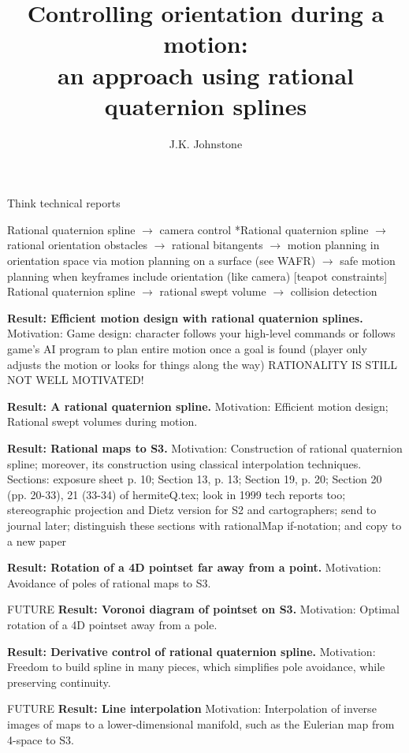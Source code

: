 \documentclass[12pt]{article}
\title{Controlling orientation during a motion:\\ 
       an approach using rational quaternion splines}
\author{J.K. Johnstone}
\begin{document}
\maketitle


Think technical reports

Rational quaternion spline $\rightarrow$ camera control 
*Rational quaternion spline  $\rightarrow$ rational orientation obstacles 
 $\rightarrow$ rational bitangents
 $\rightarrow$ motion planning in orientation space via motion planning on a surface
          (see WAFR)
  $\rightarrow$ safe motion planning when keyframes include orientation (like camera)
    [teapot constraints]
Rational quaternion spline  $\rightarrow$ rational swept volume  $\rightarrow$ 
collision detection

{\bf Result: Efficient motion design with rational quaternion splines.}
Motivation: Game design: character follows your high-level commands or follows
            game's AI program to plan entire motion once a goal is found (player only
	    adjusts the motion or looks for things along the way)
	    RATIONALITY IS STILL NOT WELL MOTIVATED!

{\bf Result: A rational quaternion spline.}
Motivation: Efficient motion design; Rational swept volumes during motion.

{\bf Result: Rational maps to S3.}
Motivation: Construction of rational quaternion spline; 
            moreover, its construction using classical interpolation techniques.
Sections: exposure sheet p. 10; Section 13, p. 13; Section 19, p. 20; 
          Section 20 (pp. 20-33), 21 (33-34) of hermiteQ.tex;
	  look in 1999 tech reports too; stereographic projection 
	  and Dietz version for S2 and cartographers;
	  send to journal later;
  distinguish these sections with rationalMap if-notation;
  and copy to a new paper

{\bf *Result: Rotation of a 4D pointset far away from a point.}
Motivation: Avoidance of poles of rational maps to S3.

FUTURE
{\bf Result: Voronoi diagram of pointset on S3.}
Motivation: Optimal rotation of a 4D pointset away from a pole.

{\bf *Result: Derivative control of rational quaternion spline.}
Motivation: Freedom to build spline in many pieces, which simplifies pole avoidance,
            while preserving continuity.

FUTURE
{\bf Result: Line interpolation}
Motivation: Interpolation of inverse images of maps to a lower-dimensional manifold,
            such as the Eulerian map from 4-space to S3.
\end{document}
